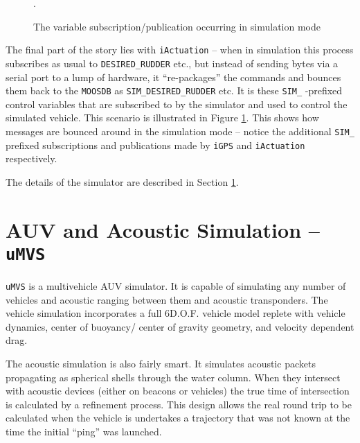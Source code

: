 \documentclass[a4paper,10pt]{article}
\newcommand{\Code}[1]{\texttt{#1} }
\newcommand{\code}[1]{\Code{#1} }
\newcommand{\DB}   {\code{{MOOSDB}}}
\begin{document}
\begin{figure}[ht]
\centering {} \caption{The variable subscription/publication
occurring  in simulation mode }\label{fig:SimulationMode}.
\end{figure}

The final part of the story lies with \code{iActuation} -- when in
simulation this process subscribes as usual to
\code{DESIRED\_RUDDER} etc., but instead of sending bytes via a
serial port to a lump of hardware, it ``re-packages'' the commands
and bounces them back to the \DB as \code{SIM\_DESIRED\_RUDDER}
etc. It is these \code{SIM\_}-prefixed control  variables that are
subscribed to by the simulator and used to control the simulated
vehicle. This scenario is illustrated in Figure
\ref{fig:SimulationMode}. This shows how messages are bounced
around in the simulation mode -- notice the additional \code{SIM\_}
prefixed subscriptions and publications made by \code{iGPS} and
\code{iActuation} respectively.

The details of the simulator are described in Section
\ref{sec:uMVS}.

\section{AUV and Acoustic Simulation  -- \code{uMVS}}\label{sec:uMVS}
\code{uMVS} is a multivehicle AUV simulator. It is capable of
simulating any number of vehicles and acoustic ranging between
them and acoustic transponders. The vehicle simulation
incorporates a full 6D.O.F. vehicle model replete with vehicle
dynamics, center of buoyancy/ center of gravity geometry, and
velocity dependent drag.

The acoustic simulation is also fairly smart. It simulates
acoustic packets propagating as spherical shells through the water
column. When they intersect with acoustic devices (either on
beacons or vehicles) the true time of intersection is calculated
by a refinement process. This design allows the real round trip to
be calculated when the vehicle is undertakes a trajectory that was
not known at the time the initial ``ping'' was launched.
\end{document}
